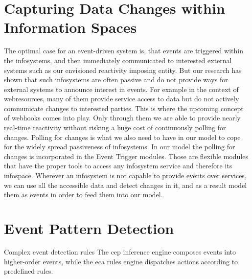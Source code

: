 

\section{Capturing Data Changes within Information Spaces}
The optimal case for an event-driven system is, that events are triggered within the \textrm{\glspl{infosystem}}, and then immediately communicated to interested external systems such as our envisioned reactivity imposing entity.
But our research has shown that such \textrm{\glspl{infosystem}} are often passive and do not provide ways for external systems to announce interest in events.
For example in the context of \textrm{\glspl{webresource}}, many of them provide service access to data but do not actively communicate changes to interested parties.
This is where the upcoming concept of \textrm{\glspl{webhook}} comes into play.
Only through them we are able to provide nearly real-time reactivity without risking a huge cost of continuously polling for changes.
Polling for changes is what we also need to have in our model to cope for the widely spread passiveness of \textrm{\glspl{infosystem}}.
In our model the polling for changes is incorporated in the \textrm{Event Trigger} modules.
Those are flexible modules that have the proper tools to access any \textrm{\gls{infosystem}} service and therefore its \textrm{\gls{infospace}}.
Wherever an \textrm{\gls{infosystem}} is not capable to provide events over services, we can use all the accessible data and detect changes in it, and as a result model them as events in order to feed them into our model.



\section{Event Pattern Detection}
Complex event detection rules \cite{akdere2008plan}\cite{2004_1265833}
The \textrm{\acrshort{cep}} inference engine composes events into higher-order events, while the \textrm{\acrshort{eca}} rules engine dispatches actions according to predefined rules.

